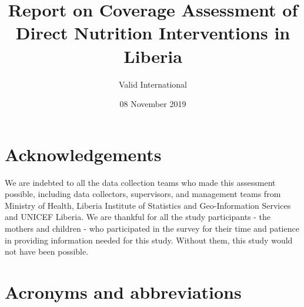 \documentclass[12pt,a4paper]{article}
\title{Report on Coverage Assessment of Direct Nutrition Interventions in Liberia}
\author{Valid International}
\date{08 November 2019}
\begin{document}
\maketitle

\newpage 


{
\hypersetup{linkcolor=black}
\setcounter{tocdepth}{3}
\tableofcontents
}
\listoftables
\listoffigures
\newpage

\hypertarget{acknowledgements}{%
\section*{Acknowledgements}\label{acknowledgements}}

We are indebted to all the data collection teams who made this assessment possible, including data collectors, supervisors, and management teams from Ministry of Health, Liberia Institute of Statistics and Geo-Information Services and UNICEF Liberia. We are thankful for all the study participants - the mothers and children - who participated in the survey for their time and patience in providing information needed for this study. Without them, this study would not have been possible.

\newpage

\hypertarget{acronyms-and-abbreviations}{%
\section*{Acronyms and abbreviations}\label{acronyms-and-abbreviations}}
\end{document}
